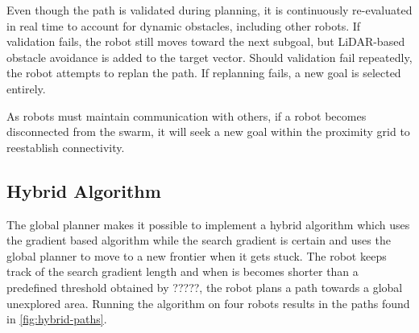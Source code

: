 Even though the path is validated during planning, it is continuously re-evaluated in real time to account for dynamic obstacles, including other robots.
If validation fails, the robot still moves toward the next subgoal, but LiDAR-based obstacle avoidance is added to the target vector.
Should validation fail repeatedly, the robot attempts to replan the path. If replanning fails, a new goal is selected entirely.

As robots must maintain communication with others, if a robot becomes disconnected from the swarm, it will seek a new goal within the proximity grid to reestablish connectivity.

\subsection{Hybrid Algorithm}
The global planner makes it possible to implement a hybrid algorithm which uses the gradient based algorithm while the search gradient is certain and uses the global planner to move to a new frontier when it gets stuck. The robot keeps track of the search gradient length and when is becomes shorter than a predefined threshold {\color{red} obtained by ?????}, the robot plans a path towards a global unexplored area. Running the algorithm on four robots results in the paths found in \cref{fig:hybrid-paths}.


